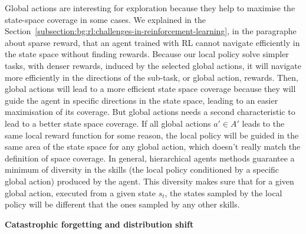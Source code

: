 Global actions are interesting for exploration because they help to maximise the state-space coverage in some cases.
We explained in the Section~\ref{subsection:bg:rl:challenges-in-reinforcement-learning}, in the paragraphe about sparse
reward, that an agent trained with RL cannot navigate efficiently in the state space without finding rewards.
Because our local policy solve simpler tasks, with denser rewards, induced by the selected global actions, it will
navigate more efficiently in the directions of the sub-task, or global action, rewards.
Then, global actions will lead to a more efficient state space coverage because they will guide the agent in specific
directions in the state space, leading to an easier maximisation of its coverage.
But global actions needs a second characteristic to lead to a better state space coverage.
If all global actions $a' \in A'$ leads to the same local reward function for some reason, the local policy will be
guided in the same area of the state space for any global action, which doesn't really match the definition of space
coverage.
In general, hierarchical agents methods guarantee a minimum of diversity in the skills (the local policy conditioned
by a specific global action) produced by the agent.
This diversity makes sure that for a given global action, executed from a given state $s_t$, the states sampled by the
local policy will be different that the ones sampled by any other skills.

\textbf{Catastrophic forgetting and distribution shift}

